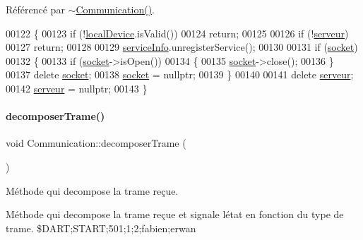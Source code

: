 Référencé par \hyperlink{communication_8cpp_source_l00036}{$\sim$\+Communication()}.


\begin{DoxyCode}
00122 \{
00123     \textcolor{keywordflow}{if} (!\hyperlink{class_communication_a6281796eab7523bef6be1a766e0e906f}{localDevice}.isValid())
00124         \textcolor{keywordflow}{return};
00125 
00126     \textcolor{keywordflow}{if} (!\hyperlink{class_communication_a6384747297d6efa9e8fd2fc79ed0c269}{serveur})
00127         \textcolor{keywordflow}{return};
00128 
00129     \hyperlink{class_communication_aa7f9ee5e5d90336a56857ebc229e4274}{serviceInfo}.unregisterService();
00130 
00131     \textcolor{keywordflow}{if} (\hyperlink{class_communication_aa4ddc3151b305db0135d5826384645cc}{socket})
00132     \{
00133         \textcolor{keywordflow}{if} (\hyperlink{class_communication_aa4ddc3151b305db0135d5826384645cc}{socket}->isOpen())
00134         \{
00135            \hyperlink{class_communication_aa4ddc3151b305db0135d5826384645cc}{socket}->close();
00136         \}
00137         \textcolor{keyword}{delete} \hyperlink{class_communication_aa4ddc3151b305db0135d5826384645cc}{socket};
00138         \hyperlink{class_communication_aa4ddc3151b305db0135d5826384645cc}{socket} = \textcolor{keyword}{nullptr};
00139     \}
00140 
00141     \textcolor{keyword}{delete} \hyperlink{class_communication_a6384747297d6efa9e8fd2fc79ed0c269}{serveur};
00142     \hyperlink{class_communication_a6384747297d6efa9e8fd2fc79ed0c269}{serveur} = \textcolor{keyword}{nullptr};
00143 \}
\end{DoxyCode}
\mbox{\label{class_communication_aaf5333662717e69837d2d39164e5a303}} 
\paragraph{\texorpdfstring{decomposer\+Trame()}{decomposerTrame()}}
{\footnotesize\ttfamily void Communication\+::decomposer\+Trame (\begin{DoxyParamCaption}{ }\end{DoxyParamCaption})\hspace{0.3cm}{\ttfamily [private]}}



Méthode qui decompose la trame reçue. 

Méthode qui decompose la trame reçue et signale l\textquotesingle{}état en fonction du type de trame. \$\+D\+A\+RT;S\+T\+A\+RT;501;1;2;fabien;erwan

